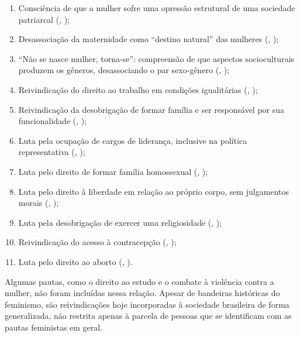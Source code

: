 \documentclass[
	12pt,				%
	openright,			%
	twoside,			%
	a4paper,			%
	english,			%
	brazil				%
	]{abntex2}
\begin{document}
  \begin{enumerate}
  \item Consciência de que a mulher sofre uma opressão estrutural de uma sociedade patriarcal (, \citeyear{duarte2019});
  \item Desassociação da maternidade como “destino natural” das mulheres (, \citeyear{duarte2019});
  \item “Não se nasce mulher, torna-se”: compreensão de que aspectos socioculturais produzem os gêneros, desassociando o par sexo-gênero (, \citeyear{beauvoir1967});
  \item Reivindicação do direito ao trabalho em condições igualitárias (, \citeyear{duarte2019});
  \item Reivindicação da desobrigação de formar família e ser responsável por sua funcionalidade (, \citeyear{duarte2019});
  \item Luta pela ocupação de cargos de liderança, inclusive na política representativa (, \citeyear{duarte2019});
  \item Luta pelo direito de formar família homossexual (, \citeyear{duarte2019});
  \item Luta pelo direito à liberdade em relação ao próprio corpo, sem julgamentos morais (, \citeyear{duarte2019});
  \item Luta pela desobrigação de exercer uma religiosidade (, \citeyear{duarte2019});
  \item Reivindicação do acesso à contracepção (, \citeyear{duarte2019});
  \item Luta pelo direito ao aborto (, \citeyear{duarte2019}).
\end{enumerate}

 Algumas pautas, como o direito ao estudo e o combate à violência contra a mulher, não foram incluídas nessa relação. Apesar de bandeiras históricas do feminismo, são reivindicações hoje incorporadas à sociedade brasileira de forma generalizada, não restrita apenas à parcela de pessoas que se identificam com as pautas feministas em geral.
 
\end{document}
